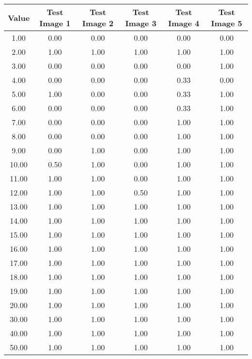 \begin{tabular}{|c|c|c|c|c|c|}
\hline
\textbf{Value}&\textbf{Test Image 1}&\textbf{Test Image 2}&\textbf{Test Image 3}&\textbf{Test Image 4}&\textbf{Test Image 5}\\\hline
1.00&0.00&0.00&0.00&0.00&0.00\\\hline
2.00&1.00&1.00&1.00&1.00&1.00\\\hline
3.00&0.00&0.00&0.00&0.00&1.00\\\hline
4.00&0.00&0.00&0.00&0.33&0.00\\\hline
5.00&1.00&0.00&0.00&0.33&1.00\\\hline
6.00&0.00&0.00&0.00&0.33&1.00\\\hline
7.00&0.00&0.00&0.00&1.00&1.00\\\hline
8.00&0.00&0.00&0.00&1.00&1.00\\\hline
9.00&0.00&1.00&0.00&1.00&1.00\\\hline
10.00&0.50&1.00&0.00&1.00&1.00\\\hline
11.00&1.00&1.00&0.00&1.00&1.00\\\hline
12.00&1.00&1.00&0.50&1.00&1.00\\\hline
13.00&1.00&1.00&1.00&1.00&1.00\\\hline
14.00&1.00&1.00&1.00&1.00&1.00\\\hline
15.00&1.00&1.00&1.00&1.00&1.00\\\hline
16.00&1.00&1.00&1.00&1.00&1.00\\\hline
17.00&1.00&1.00&1.00&1.00&1.00\\\hline
18.00&1.00&1.00&1.00&1.00&1.00\\\hline
19.00&1.00&1.00&1.00&1.00&1.00\\\hline
20.00&1.00&1.00&1.00&1.00&1.00\\\hline
30.00&1.00&1.00&1.00&1.00&1.00\\\hline
40.00&1.00&1.00&1.00&1.00&1.00\\\hline
50.00&1.00&1.00&1.00&1.00&1.00\\\hline
\end{tabular}
